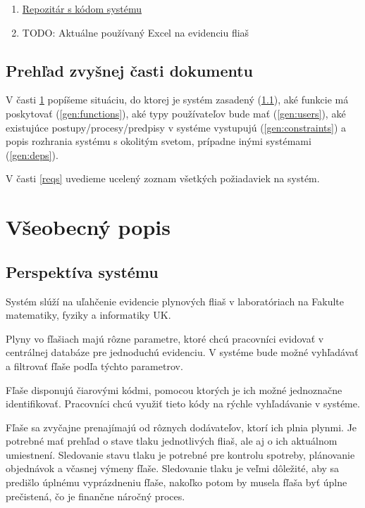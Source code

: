 \documentclass{zah}
\begin{document}
\begin{enumerate}
	\item \href{https://github.com/TIS2023-FMFI/evidencia-flias}{Repozitár s kódom systému}
	\item {\color{red} TODO: Aktuálne používaný Excel na evidenciu fliaš}
\end{enumerate}

\subsection{Prehľad zvyšnej časti dokumentu}

V časti \ref{general} popíšeme situáciu, do ktorej je systém zasadený (\ref{gen:perspective}), aké funkcie má poskytovať (\ref{gen:functions}), aké typy používateľov bude mať (\ref{gen:users}), aké existujúce postupy/procesy/predpisy v systéme vystupujú (\ref{gen:constraints}) a popis rozhrania systému s okolitým svetom, prípadne inými systémami (\ref{gen:deps}).

V časti \ref{reqs} uvedieme ucelený zoznam všetkých požiadaviek na systém.

\cleardoublepage
\section{Všeobecný popis}
\label{general}

\subsection{Perspektíva systému}
\label{gen:perspective}
Systém slúží na uľahčenie evidencie plynových fliaš v laboratóriach na Fakulte matematiky, fyziky a informatiky UK.

Plyny vo fľašiach majú rôzne parametre, ktoré chcú pracovníci evidovať v centrálnej databáze pre jednoduchú evidenciu.
V systéme bude možné vyhľadávať a filtrovať fľaše podľa týchto parametrov.

Fľaše disponujú čiarovými kódmi, pomocou ktorých je ich možné jednoznačne identifikovať. Pracovníci chcú využiť tieto kódy na rýchle vyhľadávanie v systéme.

Fľaše sa zvyčajne prenajímajú od rôznych dodávateľov, ktorí ich plnia plynmi. Je potrebné mať prehľad o stave tlaku jednotlivých fliaš, ale aj o ich aktuálnom umiestnení. Sledovanie stavu tlaku je potrebné pre kontrolu spotreby, plánovanie objednávok a včasnej výmeny fľaše. Sledovanie tlaku je veľmi dôležité, aby sa predišlo úplnému vyprázdneniu fľaše, nakoľko potom by musela fľaša byť úplne prečistená, čo je finančne náročný proces.
\end{document}
